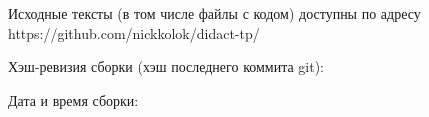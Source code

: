 Исходные тексты (в том числе файлы с кодом) доступны по адресу https://github.com/nickkolok/didact-tp/

Хэш-ревизия сборки (хэш последнего коммита git):


Дата и время сборки:


